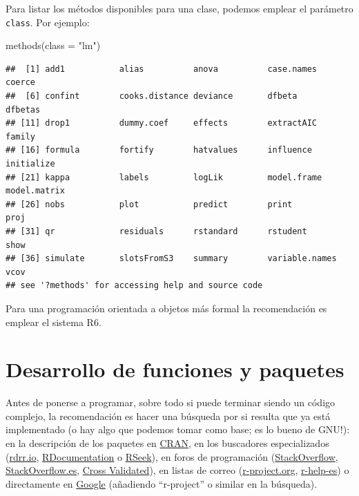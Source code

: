 \documentclass[
]{book}
\newenvironment{Shaded}{\begin{snugshade}}{\end{snugshade}}
\newcommand{\AttributeTok}[1]{\textcolor[rgb]{0.77,0.63,0.00}{#1}}
\newcommand{\FunctionTok}[1]{\textcolor[rgb]{0.00,0.00,0.00}{#1}}
\newcommand{\NormalTok}[1]{#1}
\newcommand{\StringTok}[1]{\textcolor[rgb]{0.31,0.60,0.02}{#1}}
\theoremstyle{break}
\theoremstyle{nonumberplain}
\begin{document}
Para listar los métodos disponibles para una clase, podemos emplear el parámetro \texttt{class}.
Por ejemplo:

\begin{Shaded}
\begin{Highlighting}[]
\FunctionTok{methods}\NormalTok{(}\AttributeTok{class =} \StringTok{"lm"}\NormalTok{)}
\end{Highlighting}
\end{Shaded}

\begin{verbatim}
##  [1] add1           alias          anova          case.names     coerce        
##  [6] confint        cooks.distance deviance       dfbeta         dfbetas       
## [11] drop1          dummy.coef     effects        extractAIC     family        
## [16] formula        fortify        hatvalues      influence      initialize    
## [21] kappa          labels         logLik         model.frame    model.matrix  
## [26] nobs           plot           predict        print          proj          
## [31] qr             residuals      rstandard      rstudent       show          
## [36] simulate       slotsFromS3    summary        variable.names vcov          
## see '?methods' for accessing help and source code
\end{verbatim}

Para una programación orientada a objetos más formal la recomendación es emplear el sistema R6.

\hypertarget{desarrollo}{%
\section{Desarrollo de funciones y paquetes}\label{desarrollo}}

Antes de ponerse a programar, sobre todo si puede terminar siendo un código complejo, la recomendación es hacer una búsqueda por si resulta que ya está implementado (o hay algo que podemos tomar como base; es lo bueno de GNU!): en la descripción de los paquetes en \href{https://cran.r-project.org/web/packages/available_packages_by_date.html}{CRAN}, en los buscadores especializados (\href{https://rdrr.io/}{rdrr.io}, \href{https://www.rdocumentation.org/}{RDocumentation} o \href{http://rseek.org/}{RSeek}), en foros de programación (\href{http://stackoverflow.com/questions/tagged/r}{StackOverflow}, \href{https://es.stackoverflow.com/questions/tagged/r}{StackOverflow.es}, \href{https://stats.stackexchange.com}{Cross Validated}), en listas de correo (\href{https://stat.ethz.ch/mailman/listinfo}{r-project.org}, \href{https://r-help-es.r-project.narkive.com}{r-help-es}) o directamente en \href{https://www.google.com/search?q=r-project}{Google} (añadiendo ``r-project'' o similar en la búsqueda).
\end{document}
